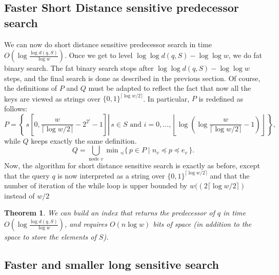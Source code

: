 \documentclass[a4paper,11pt]{article}
\newtheorem{theorem}{Theorem}[section]
\newcommand{\?}{\mskip1.5mu}
\begin{document}
\subsection{Faster Short Distance sensitive predecessor search}

We can now do short distance sensitive predecessor search 
in time $O(\log\frac{\log d(q, S)}{\log w})$. 
Once we get to level $\log\log d(q,S) - \log\log w$, we do fat 
binary search. The fat binary search stops after 
$\log\log d(q, S)-\log\log w$ steps, and the final search 
is done as described in the previous section. 
Of course, the definitions of $P$ and $Q$ must be adapted to 
reflect the fact that now all the keys are viewed as strings 
over $\{0, 1\}^{\lceil\log w/2\rceil}$. 
In particular, $P$ is redefined as follows:
\[
P = \left\{\,s\left[0,\frac{w}{\lceil\log w/2\rceil} - 2^{2^i} - 1\right] 
\left\vert \,s \in  S \text{ and }
	i=0,\dots,\left\lfloor\log(\log \frac{w}{\lceil\log w/2\rceil} - 1)
	\right\rfloor\,\right.\right\},
\]
while $Q$ keeps exactly the same definition. 
\[
Q=\bigcup_{\text{node $v$}}\min{}_\preceq\{\,p\in P\mid n_v\preceq p 
\preceq e_v\,\}.
\]
Now, the algorithm for short distance sensitive search is 
exactly as before, except that the query $q$ is now interpreted 
as a string over $\{0, 1\}^{\lceil\log w/2\rceil}$ and that the 
number of iteration of the while loop is upper bounded by 
$w((2\lceil\log w/2\rceil)$ instead of $w/2$
\begin{theorem}
\label{thm:pred-short}
We can build an index that returns the predecessor of $q$
in time $O\left(\log\frac{\log d(q,S)}{\log w}\right)$, 
and requires $O(n \log w )$
bits of space (in addition to the space to store the elements of $S$).
\end{theorem}


\subsection{Faster and smaller long sensitive search}
\end{document}
